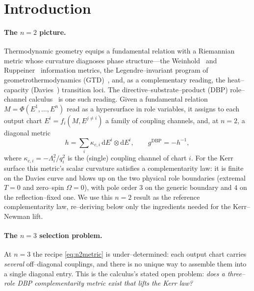 \documentclass[11pt]{article}
\newcommand{\dd}{\mathrm{d}}
\begin{document}
\tableofcontents

\section{Introduction}
\label{sec:intro}

\paragraph{The $n=2$ picture.}
Thermodynamic geometry equips a fundamental relation with a Riemannian metric whose curvature
diagnoses phase structure---the Weinhold~\cite{Weinhold1975} and Ruppeiner~\cite{Ruppeiner1995}
information metrics, the Legendre--invariant program of geometrothermodynamics
(GTD)~\cite{Quevedo2007}, and, as a complementary reading, the heat--capacity
(Davies~\cite{Davies1977}) transition loci. The directive--substrate--product (DBP)
role--channel calculus~\cite{Lloyd2026} is one such reading. Given a fundamental relation
$M=\Phi(E^1,\dots,E^n)$ read as a hypersurface in role variables, it assigns to each output chart
$E^i=f_i(M,E^{j\ne i})$ a family of coupling channels, and, at $n=2$, a diagonal metric
\begin{equation}
h=\sum_i \kappa_{c,i}\,\dd E^i\otimes \dd E^i,\qquad g^{\mathrm{DBP}}=-h^{-1},
\label{eq:n2metric}
\end{equation}
where $\kappa_{c,i}=-\Lambda_i^2/q_i^2$ is the (single) coupling channel of chart $i$. For the
Kerr surface this metric's scalar curvature satisfies a complementarity law: it is finite on
the Davies curve and blows up on the two physical role boundaries (extremal $T=0$ and
zero--spin $\Omega=0$), with pole order $3$ on the generic boundary and $4$ on the
reflection--fixed one. We use this $n=2$ result as the reference complementarity law,
re--deriving below only the ingredients needed for the Kerr--Newman lift.

\paragraph{The $n=3$ selection problem.}
At $n=3$ the recipe \eqref{eq:n2metric} is under--determined: each output chart carries
\emph{several} off--diagonal couplings, and there is no unique way to assemble them into a
single diagonal entry. This is the calculus's stated open problem: \emph{does a
three--role DBP complementarity metric exist that lifts the Kerr law?}
\end{document}

